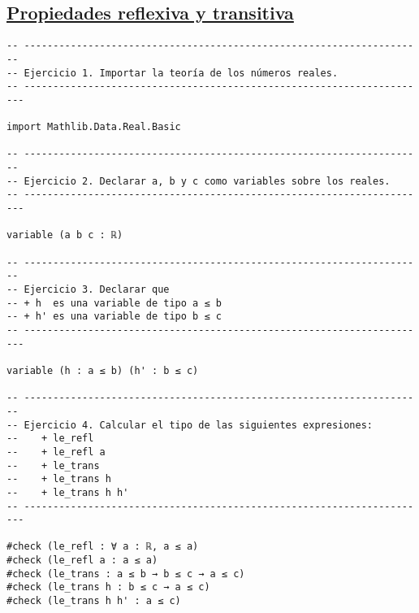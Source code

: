 \subsection{\href{./src/Basicos/Propiedades\_reflexiva\_y\_transitiva.lean}{Propiedades reflexiva y transitiva}}
\label{sec:org6729651}
\begin{verbatim}
-- ---------------------------------------------------------------------
-- Ejercicio 1. Importar la teoría de los números reales.
-- ----------------------------------------------------------------------

import Mathlib.Data.Real.Basic

-- ---------------------------------------------------------------------
-- Ejercicio 2. Declarar a, b y c como variables sobre los reales.
-- ----------------------------------------------------------------------

variable (a b c : ℝ)

-- ---------------------------------------------------------------------
-- Ejercicio 3. Declarar que
-- + h  es una variable de tipo a ≤ b
-- + h' es una variable de tipo b ≤ c
-- ----------------------------------------------------------------------

variable (h : a ≤ b) (h' : b ≤ c)

-- ---------------------------------------------------------------------
-- Ejercicio 4. Calcular el tipo de las siguientes expresiones:
--    + le_refl
--    + le_refl a
--    + le_trans
--    + le_trans h
--    + le_trans h h'
-- ----------------------------------------------------------------------

#check (le_refl : ∀ a : ℝ, a ≤ a)
#check (le_refl a : a ≤ a)
#check (le_trans : a ≤ b → b ≤ c → a ≤ c)
#check (le_trans h : b ≤ c → a ≤ c)
#check (le_trans h h' : a ≤ c)
\end{verbatim}

